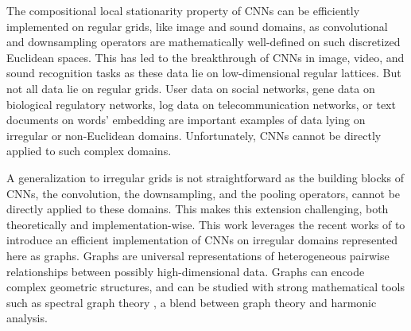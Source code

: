 \documentclass{article}
\newcommand{\bO}{\mathcal{O}}
\begin{document}
The compositional local stationarity property of CNNs can be efficiently
implemented on regular grids, like image and sound domains, as convolutional and
downsampling operators are mathematically well-defined on such discretized
Euclidean spaces. This has led to the breakthrough of CNNs in image, video, and
sound recognition tasks \cite{art:LeCunBengioHinton15DL} as these data lie on
low-dimensional regular lattices. But not all data lie on regular grids. User
data on social networks, gene data on biological regulatory networks, log data
on telecommunication networks, or text documents on words' embedding are
important examples of data lying on irregular or non-Euclidean domains.
Unfortunately, CNNs cannot be directly applied to such complex domains.

A generalization to irregular grids is not straightforward as the building blocks of
CNNs, the convolution, the downsampling, and the pooling operators, cannot be directly applied to these domains. This makes this extension challenging, both theoretically and
implementation-wise. This work leverages the recent works of
\cite{pro:GregorLeCun10LRF, pro:CoatesNg11LRF,
art:BrunaZarembaSzlamLeCun13DLgraphs, art:HenaffBrunaLeCun15DLgraphs,
art:HammondVandergheynstGribonval11GraphWav,
art:ShumanNarangFrossardOrtegaVandergheynst13ReviewSPG} to introduce an
efficient implementation of CNNs on irregular domains represented here as
graphs. Graphs are universal representations of heterogeneous pairwise
relationships between possibly high-dimensional data. Graphs can encode complex
geometric structures, and can be studied with strong mathematical tools such as
spectral graph theory \cite{book:Chung97Spectral}, a blend between graph theory and harmonic analysis.

\end{document}
